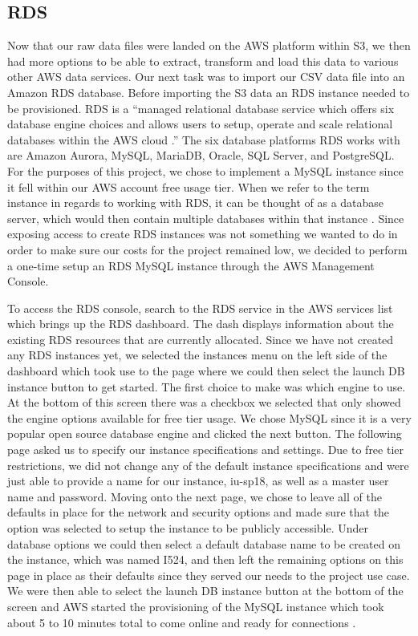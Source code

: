 \subsection{RDS}

Now that our raw data files were landed on the AWS platform within S3, we then 
had more options to be able to extract, transform and load this data to 
various other AWS data services. Our next task was to import our CSV data 
file into an Amazon RDS database. Before importing the S3 data an RDS instance 
needed to be provisioned. RDS is a ``managed relational database service which 
offers six database engine choices and allows users to setup, operate and 
scale relational databases within the AWS 
cloud \cite{hid-sp18-521-rds-mysql}.'' The six database platforms RDS works 
with are Amazon Aurora, MySQL, MariaDB, Oracle, SQL Server, and PostgreSQL. 
For the purposes of this project, we chose to implement a MySQL instance since 
it fell within our AWS account free usage tier. When we refer to the term 
instance in regards to working with RDS, it can be thought of as a database 
server, which would then contain multiple databases within that 
instance \cite{hid-sp18-521-rds-mysql}. Since exposing access to create RDS 
instances was not something we wanted to do in order to make sure our costs 
for the project remained low, we decided to perform a one-time setup an RDS 
MySQL instance through the AWS Management Console.  

To access the RDS console, search to the RDS service in the AWS services list 
which brings up the RDS dashboard. The dash displays information about the 
existing RDS resources that are currently allocated. Since we have not created 
any RDS instances yet, we selected the instances menu on the left side of the 
dashboard which took use to the page where we could then select the launch DB 
instance button to get started. The first choice to make was which engine to 
use. At the bottom of this screen there was a checkbox we selected that only 
showed the engine options available for free tier usage. We chose MySQL since 
it is a very popular open source database engine and clicked the next button. 
The following page asked us to specify our instance specifications and 
settings. Due to free tier restrictions, we did not change any of the default 
instance specifications and were just able to provide a name for our instance, 
iu-sp18, as well as a master user name and password. Moving onto the next 
page, we chose to leave all of the defaults in place for the network and 
security options and made sure that the option was selected to setup the 
instance to be publicly accessible. Under database options we could then 
select a default database name to be created on the instance, which was named 
I524, and then left the remaining options on this page in place as their 
defaults since they served our needs to the project use case. We were then 
able to select the launch DB instance button at the bottom of the screen and 
AWS started the provisioning of the MySQL instance which took about 5 to 10 
minutes total to come online and ready for 
connections \cite{hid-sp18-521-rds-mysql}. 

